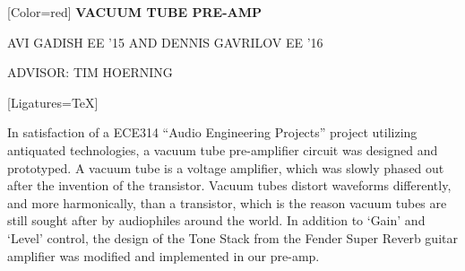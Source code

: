 \documentclass{article}
\begin{document}
{
	[Color=red]
	\fontsize{0.8in}{0.4in}\selectfont 
	\bfseries
	VACUUM TUBE PRE-AMP
}

\vspace{0.25in}

{
	\fontsize{0.55in}{0.6in}\selectfont
	AVI GADISH {\fontsize{0.4in}{0.6in}\selectfont EE '15 AND} DENNIS GAVRILOV {\fontsize{0.4in}{0.6in}\selectfont EE '16}
}

\vspace{0.1in}

{
	\fontsize{0.4in}{0.4in}\selectfont
	ADVISOR: TIM HOERNING
}

\vspace{0.2in}

{
	[Ligatures=TeX]
	\fontsize{0.397in}{0.46in}\selectfont

		In satisfaction of a ECE314 ``Audio Engineering Projects'' project
		utilizing antiquated technologies, a vacuum tube pre-amplifier circuit
		was designed and prototyped. A vacuum tube is a voltage amplifier,
		which was slowly phased out after the invention of the transistor.
		Vacuum tubes distort waveforms differently, and more harmonically,
		than a transistor, which is the reason vacuum tubes are still sought
		after by audiophiles around the world. In addition to `Gain' and
		`Level' control, the design of the Tone Stack from the Fender Super
		Reverb guitar amplifier was modified and implemented in our pre-amp.

}
\end{document}
